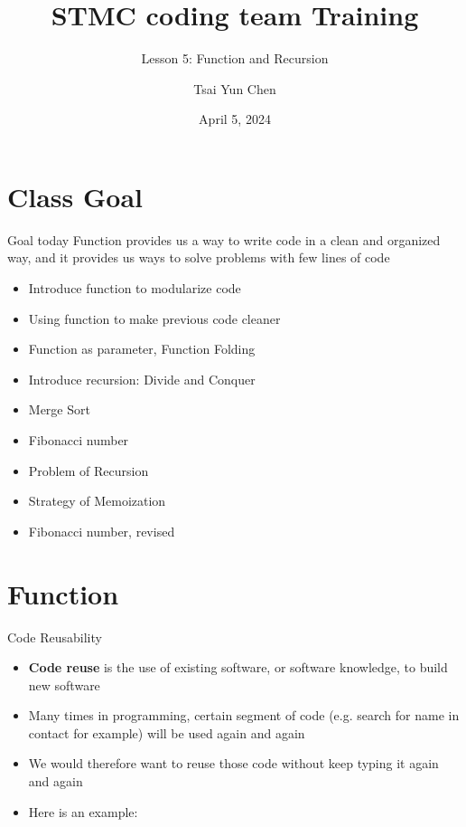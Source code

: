 \documentclass[10pt,xcolor={table,dvipsnames},t]{beamer}
\title[Your Short Title]{STMC coding team Training}
\subtitle{Lesson 5: Function and Recursion}
\author{Tsai Yun Chen}
\date{April 5, 2024}
\begin{document}
\begin{frame}
  \titlepage
\end{frame}


\section{Class Goal}

\begin{frame}{Goal today}
  Function provides us a way to write code in a clean and organized way, and it provides us ways to solve problems with few lines of code
\begin{itemize}
  \item Introduce function to modularize code
  \item Using function to make previous code cleaner
  \item Function as parameter, Function Folding
  \item Introduce recursion: Divide and Conquer
  \item Merge Sort
  \item Fibonacci number
  \item Problem of Recursion
  \item Strategy of Memoization
  \item Fibonacci number, revised
\end{itemize}

\end{frame}

\section{Function}
\begin{frame}[fragile]{Code Reusability}
  \begin{itemize}
    \item \textbf{Code reuse} is the use of existing software, or software knowledge, to build new software 
    \item Many times in programming, certain segment of code (e.g. search for name in contact for example) will be used again and again 
    \item We would therefore want to reuse those code without keep typing it again and again 
    \item Here is an example:
  \end{itemize}
\end{frame}
\end{document}
